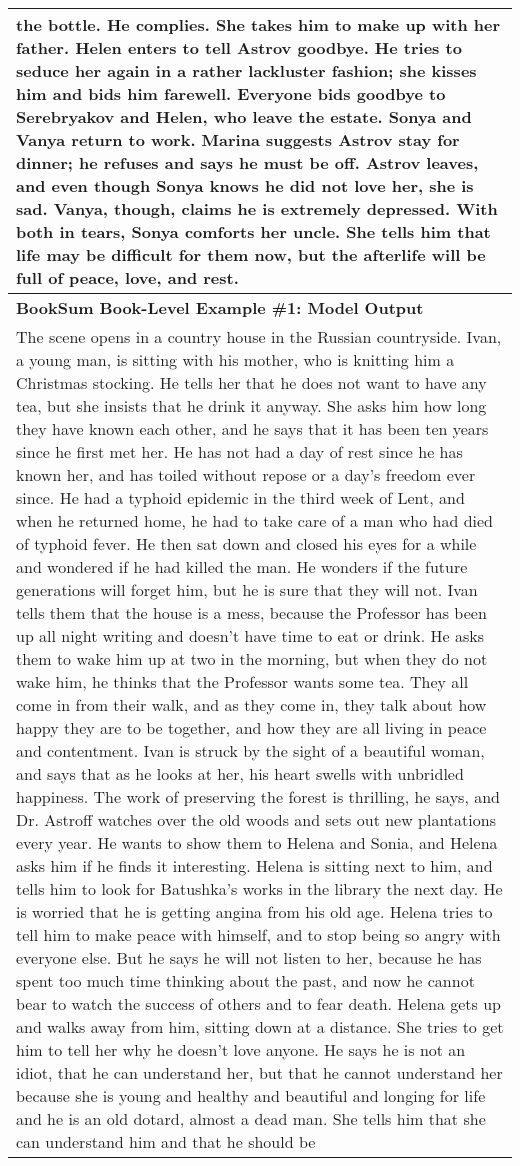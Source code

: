 \documentclass{article} \usepackage{iclr2022_conference,times}
\begin{document}
\begin{table}[!htbp]
\begin{tabular}{p{\linewidth}}
the bottle. He complies. She takes him to make up with her father. Helen enters to tell Astrov goodbye. He tries to seduce her again in a rather lackluster fashion; she kisses him and bids him farewell. Everyone bids goodbye to Serebryakov and Helen, who leave the estate. Sonya and Vanya return to work. Marina suggests Astrov stay for dinner; he refuses and says he must be off. Astrov leaves, and even though Sonya knows he did not love her, she is sad. Vanya, though, claims he is extremely depressed. With both in tears, Sonya comforts her uncle. She tells him that life may be difficult for them now, but the afterlife will be full of peace, love, and rest.
    \\
    \midrule
    \textbf{BookSum Book-Level Example \#1: Model Output} \\
    \midrule
The scene opens in a country house in the Russian countryside. Ivan, a young man, is sitting with his mother, who is knitting him a Christmas stocking. He tells her that he does not want to have any tea, but she insists that he drink it anyway. She asks him how long they have known each other, and he says that it has been ten years since he first met her. He has not had a day of rest since he has known her, and has toiled without repose or a day's freedom ever since. He had a typhoid epidemic in the third week of Lent, and when he returned home, he had to take care of a man who had died of typhoid fever. He then sat down and closed his eyes for a while and wondered if he had killed the man. He wonders if the future generations will forget him, but he is sure that they will not. Ivan tells them that the house is a mess, because the Professor has been up all night writing and doesn't have time to eat or drink. He asks them to wake him up at two in the morning, but when they do not wake him, he thinks that the Professor wants some tea. They all come in from their walk, and as they come in, they talk about how happy they are to be together, and how they are all living in peace and contentment. Ivan is struck by the sight of a beautiful woman, and says that as he looks at her, his heart swells with unbridled happiness. The work of preserving the forest is thrilling, he says, and Dr. Astroff watches over the old woods and sets out new plantations every year. He wants to show them to Helena and Sonia, and Helena asks him if he finds it interesting. Helena is sitting next to him, and tells him to look for Batushka's works in the library the next day. He is worried that he is getting angina from his old age. Helena tries to tell him to make peace with himself, and to stop being so angry with everyone else. But he says he will not listen to her, because he has spent too much time thinking about the past, and now he cannot bear to watch the success of others and to fear death. Helena gets up and walks away from him, sitting down at a distance. She tries to get him to tell her why he doesn't love anyone. He says he is not an idiot, that he can understand her, but that he cannot understand her because she is young and healthy and beautiful and longing for life and he is an old dotard, almost a dead man. She tells him that she can understand him and that he should be 
\end{tabular}
\end{table}
\end{document}
